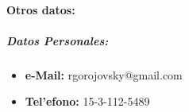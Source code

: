 \paragraph{Otros datos:}

 

\subparagraph{Datos Personales:}
\begin{itemize}
\item \textbf{e-Mail:} rgorojovsky@gmail.com 
\item \textbf{Tel'efono:} 15-3-112-5489
\end{itemize}


